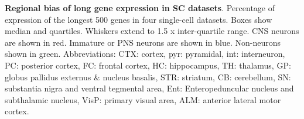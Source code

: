 \textbf{Regional bias of long gene expression in SC datasets}. Percentage of expression of the longest 500 genes in four single-cell datasets. Boxes show median and quartiles. Whiskers extend to 1.5 x inter-quartile range. CNS neurons are shown in red. Immature or PNS neurons are shown in blue. Non-neurons shown in green. Abbreviations: CTX: cortex, pyr: pyramidal, int: interneuron, PC: posterior cortex, FC: frontal cortex, HC: hippocampus, TH: thalamus, GP: globus pallidus externus & nucleus basalis, STR: striatum, CB: cerebellum, SN: substantia nigra and ventral tegmental area, Ent: Enteropeduncular nucleus and subthalamic nucleus, VisP: primary visual area, ALM: anterior lateral motor cortex.

